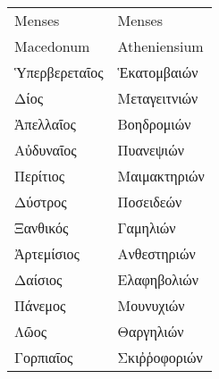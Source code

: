 %
\begin{tabular}{ l  l }
Menses                    & Menses\\
Macedonum                 & Atheniensium \\
\hline
\textgreek{Ὑπερβερεταῖος } &\textgreek{Ἑκατομβαιών} \\
\textgreek{Δίος}           &\textgreek{Μεταγειτνιών} \\
\textgreek{Ἀπελλαῖος}      &\textgreek{Βοηδρομιών} \\
%
\textgreek{Αὐδυναῖος}      &\textgreek{Πυανεψιών} \\
\textgreek{Περίτιος}        &\textgreek{Μαιμακτηριών} \\
\textgreek{Δύστρος}        &\textgreek{Ποσειδεών} \\
%
\textgreek{Ξανθικός}       &\textgreek{Γαμηλιών} \\
\textgreek{Ἀρτεμίσιος}     &\textgreek{Ανθεστηριών} \\
\textgreek{Δαίσιος}        &\textgreek{Ελαφηβολιών} \\
%
\textgreek{Πάνεμος}        &\textgreek{Μουνυχιών} \\
\textgreek{Λῶος}          &\textgreek{Θαργηλιών} \\
\textgreek{Γορπιαῖος}      &\textgreek{Σκιῤῥοφοριών} \\
\end{tabular}
%
